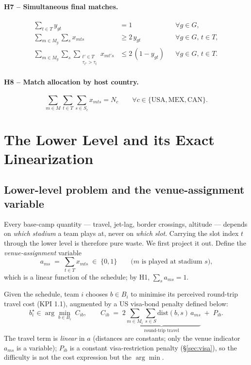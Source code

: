 \documentclass[12pt, letterpaper]{article}
\begin{document}
\paragraph{H7 -- Simultaneous final matches.}
\begin{align}
\sum_{t\in T} y_{gt}&=1 &&\forall g\in G,\\
\sum_{m\in M_g}\sum_{s} x_{mts}&\ge 2\,y_{gt} &&\forall g\in G,\,t\in T,\\
\sum_{m\in M_g}\sum_{s}\sum_{\substack{t'\in T\\ \tau_{t'}>\tau_t}} x_{mt's}
  &\le 2\,(1-y_{gt}) &&\forall g\in G,\,t\in T.
\end{align}

\paragraph{H8 -- Match allocation by host country.}
\begin{equation}
\sum_{m\in M}\sum_{t\in T}\sum_{s\in S_c} x_{mts}=N_c
  \qquad\forall c\in\{\mathrm{USA,MEX,CAN}\}.
\end{equation}

\section{The Lower Level and its Exact Linearization}
\label{sec:lower}

\subsection{Lower-level problem and the venue-assignment variable}
Every base-camp quantity --- travel, jet-lag, border crossings, altitude
--- depends on \emph{which stadium} a team plays at, never on \emph{which
slot}. Carrying the slot index $t$ through the lower level is therefore
pure waste. We first project it out. Define the \emph{venue-assignment}
variable
\begin{equation}
a_{ms}\;=\;\sum_{t\in T} x_{mts}\;\in\;\{0,1\}
  \qquad\text{($m$ is played at stadium $s$),}
\label{eq:ams}
\end{equation}
which is a linear function of the schedule; by H1, $\sum_s a_{ms}=1$.

Given the schedule, team $i$ chooses $b\in B_i$ to minimise its perceived
round-trip travel cost (KPI 1.1), augmented by a US visa-bond penalty
defined below:
\begin{equation}
b_i^\star \in \arg\min_{b\in B_i}\;
  C_{ib}, \qquad
  C_{ib}\;=\;\underbrace{2\sum_{m\in M_i}\sum_{s\in S}
            \mathrm{dist}(b,s)\,a_{ms}}_{\text{round-trip travel}}
            \;+\; P_{ib}.
\label{eq:llcost}
\end{equation}
The travel term is \emph{linear} in $a$ (distances are constants; only
the venue indicator $a_{ms}$ is a variable); $P_{ib}$ is a constant
visa-restriction penalty (\S\ref{sec:visa}), so the difficulty is not the
cost expression but the $\arg\min$.
\end{document}
